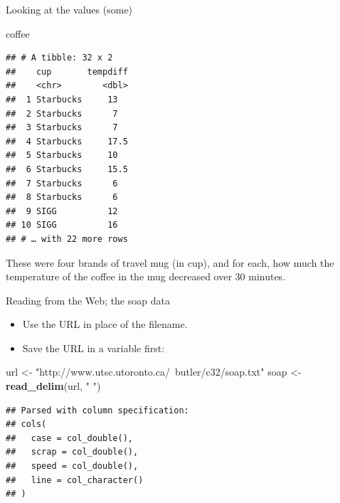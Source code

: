 \documentclass[ignorenonframetext,]{beamer}
\newenvironment{Shaded}{\begin{snugshade}}{\end{snugshade}}
\newcommand{\KeywordTok}[1]{\textcolor[rgb]{0.13,0.29,0.53}{\textbf{#1}}}
\newcommand{\NormalTok}[1]{#1}
\newcommand{\StringTok}[1]{\textcolor[rgb]{0.31,0.60,0.02}{#1}}
\providecommand{\tightlist}{%
  \setlength{\itemsep}{0pt}\setlength{\parskip}{0pt}}
\begin{document}
\begin{frame}[fragile]{Looking at the values (some)}
\protect\hypertarget{looking-at-the-values-some}{}

\begin{Shaded}
\begin{Highlighting}[]
\NormalTok{coffee}
\end{Highlighting}
\end{Shaded}

\begin{verbatim}
## # A tibble: 32 x 2
##    cup       tempdiff
##    <chr>        <dbl>
##  1 Starbucks     13  
##  2 Starbucks      7  
##  3 Starbucks      7  
##  4 Starbucks     17.5
##  5 Starbucks     10  
##  6 Starbucks     15.5
##  7 Starbucks      6  
##  8 Starbucks      6  
##  9 SIGG          12  
## 10 SIGG          16  
## # … with 22 more rows
\end{verbatim}

These were four brands of travel mug (in cup), and for each, how much
the temperature of the coffee in the mug decreased over 30 minutes.

\end{frame}

\begin{frame}[fragile]{Reading from the Web; the soap data}
\protect\hypertarget{reading-from-the-web-the-soap-data}{}

\begin{itemize}
\tightlist
\item
  Use the URL in place of the filename.
\item
  Save the URL in a variable first:
\end{itemize}

\begin{Shaded}
\begin{Highlighting}[]
\NormalTok{url <-}\StringTok{ "http://www.utsc.utoronto.ca/~butler/c32/soap.txt"}
\NormalTok{soap <-}\StringTok{ }\KeywordTok{read_delim}\NormalTok{(url, }\StringTok{" "}\NormalTok{)}
\end{Highlighting}
\end{Shaded}

\begin{verbatim}
## Parsed with column specification:
## cols(
##   case = col_double(),
##   scrap = col_double(),
##   speed = col_double(),
##   line = col_character()
## )
\end{verbatim}

\end{frame}
\end{document}

